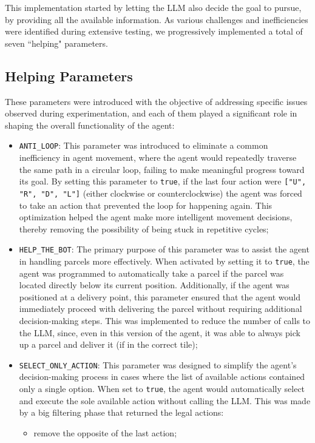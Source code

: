 This implementation started by letting the LLM also decide the goal to pursue, by
providing all the available information. As various challenges and
inefficiencies were identified during extensive testing, we progressively implemented
a total of seven ``helping" parameters.

\subsection{Helping Parameters}
These parameters were introduced with the objective of addressing specific
issues observed during experimentation, and each of them played a significant role
in shaping the overall functionality of the agent:
\begin{itemize}
  \item \texttt{ANTI\_LOOP}: This parameter was introduced to eliminate a common
    inefficiency in agent movement, where the agent would repeatedly traverse
    the same path in a circular loop, failing to make meaningful progress toward
    its goal. By setting this parameter to \texttt{true}, if the last four
    action were \texttt{["U", "R", "D", "L"]} (either clockwise or
    counterclockwise) the agent was forced to take an action that prevented the loop
    for happening again. This optimization helped the agent make more
    intelligent movement decisions, thereby removing the possibility of being stuck
    in repetitive cycles;

  \item \texttt{HELP\_THE\_BOT}: The primary purpose of this parameter was to assist
    the agent in handling parcels more effectively. When activated by setting it
    to \texttt{true}, the agent was programmed to automatically take a parcel if
    the parcel was located directly below its current position. Additionally, if
    the agent was positioned at a delivery point, this parameter ensured that the
    agent would immediately proceed with delivering the parcel without requiring
    additional decision-making steps. This was implemented to reduce the number
    of calls to the LLM, since, even in this version of the agent, it was able to
    always pick up a parcel and deliver it (if in the correct tile);

  \item \texttt{SELECT\_ONLY\_ACTION}: This parameter was designed to simplify the
    agent's decision-making process in cases where the list of available actions
    contained only a single option. When set to \texttt{true}, the agent would
    automatically select and execute the sole available action without calling
    the LLM. This was made by a big filtering phase that returned the legal actions:
    \begin{itemize}
      \item remove the opposite of the last action;


\end{itemize}
\end{itemize}
